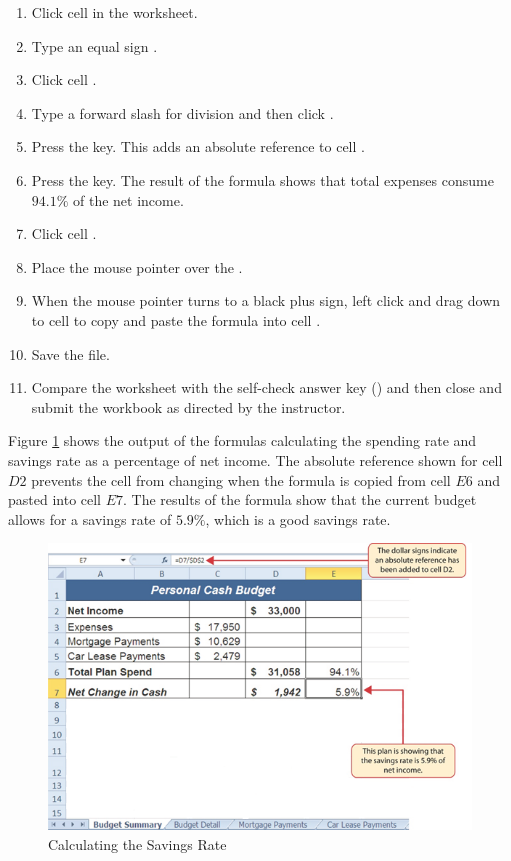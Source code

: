 \begin{enumerate}
	\item Click cell  in the  worksheet.
	\item Type an equal sign \fmtTyping{=}.
	\item Click cell .
	\item Type a forward slash \fmtTyping{/} for division and then click .
	\item Press the  key. This adds an absolute reference to cell .
	\item Press the  key. The result of the formula shows that total expenses consume $ 94.1\% $ of the net income.
	\item Click cell .
	\item Place the mouse pointer over the .
	\item When the mouse pointer turns to a black plus sign, left click and drag down to cell  to copy and paste the formula into cell .
	\item Save the  file.
	\item Compare the worksheet with the self-check answer key () and then close and submit the  workbook as directed by the instructor.
\end{enumerate}

Figure \ref{02:fig39} shows the output of the formulas calculating the spending rate and savings rate as a percentage of net income. The absolute reference shown for cell $ D2 $ prevents the cell from changing when the formula is copied from cell $ E6 $ and pasted into cell $ E7 $. The results of the formula show that the current budget allows for a savings rate of $ 5.9\% $, which is a good savings rate.

\begin{figure}[H]
	\centering
	\includegraphics[width=\maxwidth{.95\linewidth}]{gfx/ch02_fig39}
	\caption{Calculating the Savings Rate}
	\label{02:fig39}
\end{figure}

